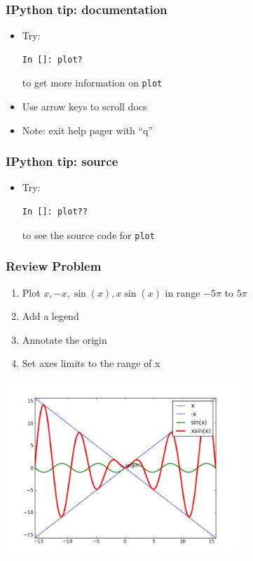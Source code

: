 \documentclass[14pt,compress]{beamer}
\newcounter{time}
\newcommand{\inctime}[1]{\addtocounter{time}{#1}{\tiny \thetime\ m}}
\newcommand{\typ}[1]{\lstinline{#1}}
\begin{document}
\begin{frame}[fragile]
\frametitle{IPython tip: documentation}

\begin{itemize}

    \item Try:
\begin{lstlisting}
In []: plot?
\end{lstlisting}
      \vspace*{0.2in}
        to get more information on \typ{plot}

      \item Use arrow keys to scroll docs
      \item Note: exit help pager with ``q''
\end{itemize}
\end{frame}

\begin{frame}[fragile]
\frametitle{IPython tip: source}
\begin{itemize}
    \item Try:
\begin{lstlisting}
In []: plot??
\end{lstlisting}
    to see the source code for \typ{plot}

\end{itemize}
\inctime{10}
\end{frame}


\begin{frame}
\frametitle{Review Problem}
\begin{enumerate}
\item Plot $x, -x, \sin(x), x \sin(x)$ in range $-5\pi$ to $5\pi$
\item Add a legend
\item Annotate the origin
\item Set axes limits to the range of x
\end{enumerate}
\vspace*{-0.15in}
\begin{center}
  \includegraphics[height=2.6in, interpolate=true]{data/four_plot}
\end{center}
\end{frame}
\end{document}
